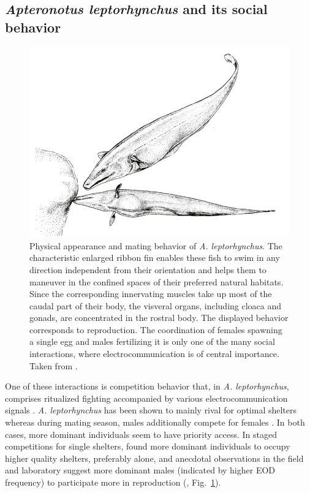 \documentclass[11pt,pdftex]{article}
\newcommand{\fref}[1]{\textup{\ref{#1}}}
\newcommand{\figb}{Fig.}
\newcommand{\figrefb}[1]{\figb~\fref{#1}}
\newcommand{\Lepto}{\textit{Apteronotus leptorhynchus}}
\newcommand{\lepto}{\textit{A. leptorhynchus}}
\begin{document}
\subsection{\Lepto{} and its social behavior}

\begin{figure}[h!]
	\centerline{\includegraphics[width=.8\textwidth]{lepto_sketch}}
	\caption{\label{lepto_sketch} Physical appearance and mating behavior of \lepto{}. The characteristic enlarged ribbon fin enables these fish to swim in any direction independent from their orientation and helps them to maneuver in the confined spaces of their preferred natural habitats. Since the corresponding innervating muscles take up most of the caudal part of their  body, the visveral organs, including cloaca and gonads, are concentrated in the rostral body. The displayed behavior corresponds to reproduction. The coordination of females spawning a single egg and males fertilizing it is only one of the many social interactions, where electrocommunication is of central importance. Taken from \citet{Hagedorn1985}.}
\end{figure}

One of these interactions is competition behavior that, in \lepto{}, comprises ritualized fighting accompanied by various electrocommunication signals \citep{Triefenbach2008, Smith2013}. \lepto{} has been shown to mainly rival for optimal shelters whereas during mating season, males additionally compete for females \citep{Hagedorn1985, Dunlap2002, Henninger2018}. In both cases, more dominant individuals seem to have priority access. In staged competitions for single shelters, \citet{Dunlap2002} found more dominant individuals to occupy higher quality shelters, preferably alone, and anecdotal observations in the field and laboratory suggest more dominant males (indicated by higher EOD frequency) to participate more in reproduction (\citealp{Hagedorn1985, Henninger2018}, \figrefb{lepto_sketch}). 
\end{document}
